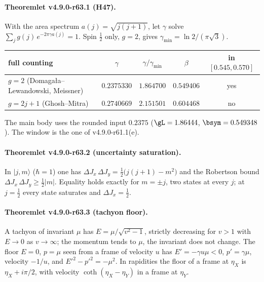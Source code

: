 \paragraph{Theoremlet v4.9.0-r63.1 (H47).}
With the area spectrum \(a(j)=\sqrt{j(j+1)}\), let \(\gamma\) solve \(\sum_j g(j)\,e^{-2\pi\gamma a(j)}=1\).  Spin \(\tfrac12\) only, \(g=2\), gives \(\gamma_{\min}=\ln2/(\pi\sqrt3)\).
\begin{center}
\small
\begin{tabular}{@{}lcccc@{}}
\toprule
full counting & \(\gamma\) & \(\gamma/\gamma_{\min}\) & \(\beta\) & in \([0.545,0.570]\)\\
\midrule
\(g=2\) (Domagała--Lewandowski, Meissner) & \(0.2375330\) & \(1.864700\) & \(0.549406\) & yes\\
\(g=2j+1\) (Ghosh--Mitra) & \(0.2740669\) & \(2.151501\) & \(0.604468\) & no\\
\bottomrule
\end{tabular}
\end{center}
The main body uses the rounded input \(0.2375\) (\(\gL=1.86444\), \(\bsym=0.549348\)).  The window is the one of v4.9.0-r61.1(e).

\paragraph{Theoremlet v4.9.0-r63.2 (uncertainty saturation).}
In \(|j,m\rangle\) (\(\hbar=1\)) one has \(\Delta J_x\,\Delta J_y=\tfrac12\bigl(j(j+1)-m^2\bigr)\) and the Robertson bound \(\Delta J_x\,\Delta J_y\ge\tfrac12|m|\).  Equality holds
exactly for \(m=\pm j\), two states at every \(j\); at \(j=\tfrac12\) every state saturates and \(\Delta J_x=\tfrac12\).

\paragraph{Theoremlet v4.9.0-r63.3 (tachyon floor).}
A tachyon of invariant \(\mu\) has \(E=\mu/\sqrt{v^2-1}\), strictly decreasing for \(v>1\) with \(E\to0\) as \(v\to\infty\); the momentum tends to \(\mu\), the invariant does not
change.  The floor \(E=0\), \(p=\mu\) seen from a frame of velocity \(u\) has \(E'=-\gamma u\mu<0\), \(p'=\gamma\mu\), velocity \(-1/u\), and \(E'^2-p'^2=-\mu^2\).  In rapidities the
floor of a frame at \(\eta_X\) is \(\eta_X+i\pi/2\), with velocity \(\coth(\eta_X-\eta_Y)\) in a frame at \(\eta_Y\).

